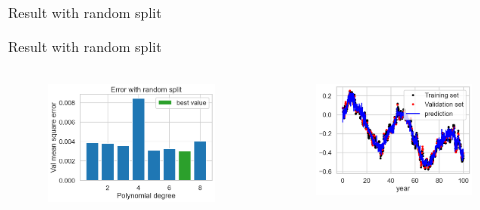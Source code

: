 \documentclass[handout, 10pt]{beamer}
\begin{document}
\begin{frame}{Result with random split}

\begin{frame}{Result with random split}
\begin{columns}
   \begin{figure}
    \includegraphics[width=.9\textwidth]{presentation/course-2/figs/leak_bar_random.png}
    \end{figure}
    
   \begin{figure}
    \includegraphics[width=.9\textwidth]{presentation/course-2/figs/leak_ts_random.png}
    \end{figure}
\end{columns}


\end{frame}
\end{frame}
\end{document}
